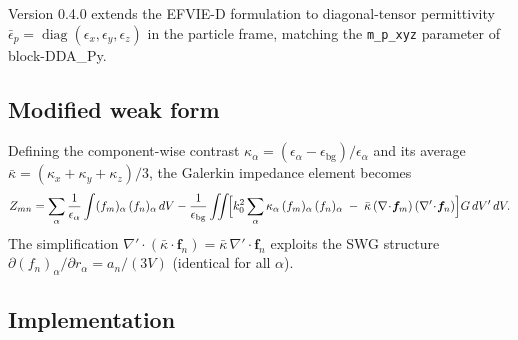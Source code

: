 \documentclass[11pt,a4paper]{article}
\begin{document}
Version 0.4.0 extends the EFVIE-D formulation to diagonal-tensor
permittivity
$\bar{\epsilon}_p = \operatorname{diag}(\epsilon_x, \epsilon_y, \epsilon_z)$
in the particle frame, matching the \texttt{m\_p\_xyz} parameter of
block-DDA\_Py.

\subsection{Modified weak form}

Defining the component-wise contrast
$\kappa_\alpha = (\epsilon_\alpha - \epsilon_{\text{bg}})/\epsilon_\alpha$
and its average
$\bar{\kappa} = (\kappa_x + \kappa_y + \kappa_z)/3$,
the Galerkin impedance element becomes
\begin{equation}\label{eq:aniso-zmn}
  Z_{mn}
  = \sum_\alpha \frac{1}{\epsilon_\alpha}
    \int (f_m)_\alpha\,(f_n)_\alpha\,dV
  - \frac{1}{\epsilon_{\text{bg}}}
    \iint \!\Bigl[
      k_0^2 \sum_\alpha \kappa_\alpha\,(f_m)_\alpha\,(f_n)_\alpha
      \;-\; \bar{\kappa}\,(\nabla\!\cdot\!\bm{f}_m)\,
             (\nabla'\!\cdot\!\bm{f}_n)
    \Bigr] G\,dV'\,dV.
\end{equation}
The simplification $\nabla'\!\cdot(\bar{\kappa}\cdot\bm{f}_n)
= \bar{\kappa}\,\nabla'\!\cdot\bm{f}_n$ exploits the SWG structure
$\partial(f_n)_\alpha/\partial r_\alpha = a_n/(3V)$ (identical for all
$\alpha$).

\subsection{Implementation}
\end{document}
